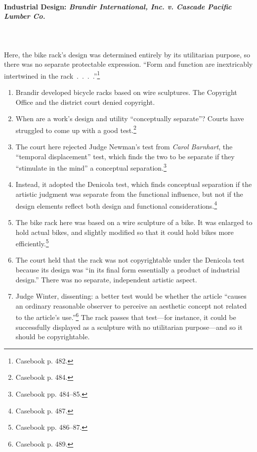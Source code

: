 \paragraph{Industrial Design: \emph{Brandir International, Inc. v. Cascade 
Pacific Lumber Co.}}
~\\\\
Here, the bike rack's design was determined entirely by its utilitarian 
purpose, so there was no separate protectable expression. ``Form and function 
are inextricably intertwined in the rack~.~.~.~.''\footnote{Casebook p. 482.}

\begin{enumerate}
    \item Brandir developed bicycle racks based on wire sculptures. The 
    Copyright Office and the district court denied copyright.
    \item When are a work's design and utility ``conceptually separate''? 
    Courts have struggled to come up with a good test.\footnote{Casebook p. 
    484.}
    \item The court here rejected Judge Newman's test from \emph{Carol 
    Barnhart}, the ``temporal displacement'' test, which finds the two to be 
    separate if they ``stimulate in the mind'' a conceptual 
    separation.\footnote{Casebook pp. 484--85.}
    \item Instead, it adopted the Denicola test, which finds conceptual 
    separation if the artistic judgment was separate from the functional 
    influence, but not if the design elements reflect both design and 
    functional considerations.\footnote{Casebook p. 487.}
    \item The bike rack here was based on a wire sculpture of a bike. It was 
    enlarged to hold actual bikes, and slightly modified so that it could hold 
    bikes more efficiently.\footnote{Casebook pp. 486--87.}
    \item The court held that the rack was not copyrightable under the 
    Denicola test because its design was ``in its final form essentially a 
    product of industrial design.'' There was no separate, independent 
    artistic aspect.
    \item Judge Winter, dissenting: a better test would be whether the article 
    ``causes an ordinary reasonable observer to perceive an aesthetic concept 
    not related to the article's use.''\footnote{Casebook p. 489.} The rack 
    passes that test---for instance, it could be successfully displayed as a 
    sculpture with no utilitarian purpose---and so it should be copyrightable.
\end{enumerate}

